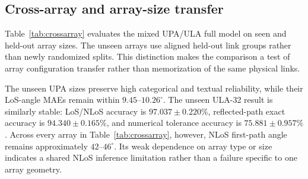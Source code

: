 \documentclass{article}
\begin{document}
\subsection{Cross-array and array-size transfer}

Table~\ref{tab:crossarray} evaluates the mixed UPA/ULA full model on seen and held-out array sizes.
The unseen arrays use aligned held-out link groups rather than newly randomized splits.
This distinction makes the comparison a test of array configuration transfer rather than memorization of the same physical links.

\begin{table}[t]
\centering
\caption{Full-model cross-array results (mean $\pm$ sample standard deviation over three seeds). UPA-$8{\times}8$ and ULA-64 are seen during mixed-array training; the remaining configurations are held out.}
\label{tab:crossarray}
\end{table}

The unseen UPA sizes preserve high categorical and textual reliability, while their LoS-angle MAEs remain within $9.45$--$10.26^\circ$.
The unseen ULA-32 result is similarly stable: LoS/NLoS accuracy is $97.037\pm0.220\%$, reflected-path exact accuracy is $94.340\pm0.165\%$, and numerical tolerance accuracy is $75.881\pm0.957\%$.
Across every array in Table~\ref{tab:crossarray}, however, NLoS first-path angle remains approximately $42$--$46^\circ$.
Its weak dependence on array type or size indicates a shared NLoS inference limitation rather than a failure specific to one array geometry.
\end{document}
